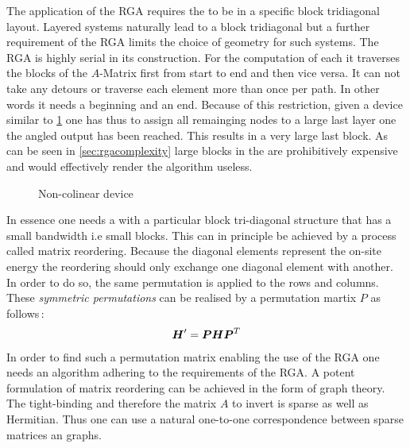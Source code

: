 The application of the RGA requires the \hamil{} to be in a specific block tridiagonal layout. Layered systems naturally lead to a block tridiagonal \hamil{} but a further requirement of the RGA limits the choice of geometry for such systems. The RGA is highly serial in its construction. For the computation of each \gfnc{} it traverses the blocks of the $A$-Matrix first from start to end and then vice versa. It can not take any detours or traverse each element more than once per path. In other words it needs a beginning and an end. Because of this restriction, given a device similar to \ref{fig:noncolinear} one has thus to assign all remainging nodes to a large last layer one the angled output has been reached. This results in a very large last block. As can be seen in \cref{sec:rgacomplexity} large blocks in the \hamil{} are prohibitively expensive and would effectively render the algorithm useless.
\begin{figure}[!ht]
\caption{Non-colinear device}
\label{fig:noncolinear}
\end{figure}
In essence one needs a \hamil{} with a particular block tri-diagonal structure that has a small bandwidth  i.e small blocks. This can in principle be achieved by a process called matrix reordering. Because the diagonal elements represent the on-site energy the reordering should only exchange one diagonal element with another. In order to do so, the same permutation is applied to the rows and columns. These \emph{symmetric permutations} can be realised by a permutation martix $P$ as follows\,\cite{saad2003iterative}:
\begin{align}
\boldsymbol{H}' = \boldsymbol{P} \boldsymbol{H} \boldsymbol{P}^{T}
\label{eqn:permutation}
\end{align}
In order to find such a permutation matrix enabling the use of the RGA one needs an algorithm adhering to the requirements of the RGA.
A potent formulation of matrix reordering can be achieved in the form of graph theory. The tight-binding \hamil{} and therefore the matrix $A$ to invert is sparse as well as Hermitian. Thus one can use a natural one-to-one correspondence between sparse matrices an graphs.
